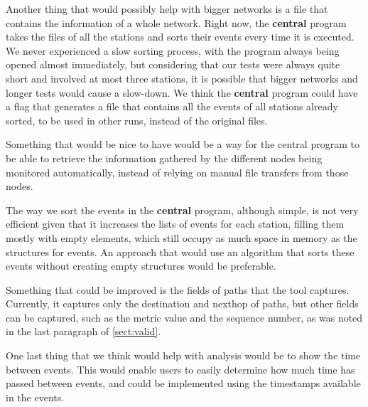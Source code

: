 Another thing that would possibly help with bigger networks is a file that
contains the information of a whole network. Right now, the \textbf{central}
program takes the files of all the stations and sorts their events every time it
is executed. We never experienced a slow sorting process, with the program
always being opened almost immediately, but considering that our tests were
always quite short and involved at most three stations, it is possible that
bigger networks and longer tests would cause a slow-down. We think the
\textbf{central} program could have a flag that generates a file that contains
all the events of all stations already sorted, to be used in other runs, instead
of the original files.

Something that would be nice to have would be a way for the central program to
be able to retrieve the information gathered by the different nodes being
monitored automatically, instead of relying on manual file transfers from those
nodes.

The way we sort the events in the \textbf{central} program, although simple, is
not very efficient given that it increases the lists of events for each station,
filling them mostly with empty elements, which still occupy as much space in
memory as the structures for events. An approach that would use an algorithm
that sorts these events without creating empty structures would be preferable.

Something that could be improved is the fields of paths that the tool captures.
Currently, it captures only the destination and nexthop of paths, but other
fields can be captured, such as the metric value and the sequence number, as was
noted in the last paragraph of \autoref{sect:valid}.

One last thing that we think would help with analysis would be to show the time
between events. This would enable users to easily determine how much time has
passed between events, and could be implemented using the timestamps available
in the events.
